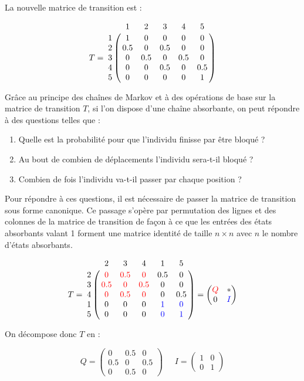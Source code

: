 \documentclass[12pt]{article}
\begin{document}
La nouvelle matrice de transition est :

$$
T = \bordermatrix{
    & 1 & 2 & 3 & 4 & 5 \cr
  1 & 1 & 0 & 0 & 0 & 0 \cr
  2 & 0.5 & 0 & 0.5 & 0 & 0 \cr
  3 & 0 & 0.5 & 0 & 0.5 & 0 \cr
  4 & 0 & 0 & 0.5 & 0 & 0.5 \cr
  5 & 0 & 0 & 0 & 0 & 1 \cr
}
$$
\vspace{0.5cm}

Grâce au principe des chaînes de Markov et à des opérations de base
sur la matrice de transition $T$, si l'on dispose d'une chaîne
absorbante, on peut répondre à des questions telles que :

\begin{enumerate}
  \item{Quelle est la probabilité pour que l'individu finisse par être
    bloqué ?}
  \item{Au bout de combien de déplacements l'individu sera-t-il
    bloqué ?}
  \item{Combien de fois l'individu va-t-il passer par chaque position ?}
\end{enumerate}

Pour répondre à ces questions, il est nécessaire de passer la matrice
de transition sous forme canonique. Ce passage s'opère par permutation
des lignes et des colonnes de la matrice de transition de façon à ce
que les entrées des états absorbants valant 1 forment une matrice
identité de taille $n \times n$ avec $n$ le nombre d'états absorbants.

$$
T = \bordermatrix{
    & 2 & 3 & 4 & 1 & 5 \cr
  2 & \color{red}0 & \color{red}0.5 & \color{red}0 & 0.5 & 0 \cr
  3 & \color{red}0.5 & \color{red}0 & \color{red}0.5 & 0 & 0 \cr
  4 & \color{red}0 & \color{red}0.5 & \color{red}0 & 0 & 0.5 \cr
  1 & 0 & 0 & 0 & \color{blue}1 & \color{blue}0 \cr
  5 & 0 & 0 & 0 & \color{blue}0 & \color{blue}1 \cr
}
=
\begin{pmatrix}
  \color{red}Q & * \\
  0 & \color{blue}I
\end{pmatrix}
$$
\vspace{0.5cm}

On décompose donc $T$ en :

$$
Q =
\begin{pmatrix}
  0 & 0.5 & 0 \\
  0.5 & 0 & 0.5 \\
  0 & 0.5 & 0
\end{pmatrix}
\;\;\;\;\;
I =
\begin{pmatrix}
  1 & 0 \\
  0 & 1
\end{pmatrix}
$$
\vspace{0.5cm}
\end{document}
